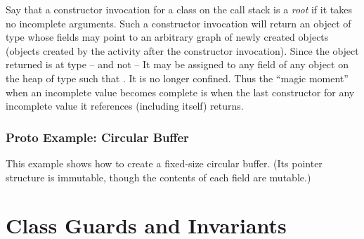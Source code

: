 Say that a constructor invocation for a class  on the call
stack is a {\em root} if it takes no incomplete arguments. Such a
constructor invocation will return an object of type  whose
fields may point to an arbitrary graph of newly created objects
(objects created by the activity after the constructor
invocation). Since the object returned is at type  -- and not
 -- It may be assigned to any field of any object on the
heap of type  such that .  It is no longer
confined. Thus the ``magic moment'' when an incomplete value becomes
complete is when the last constructor for any incomplete value it
references (including itself) returns.

\subsubsection{Proto Example: Circular Buffer}

\begin{example}
This example shows how to create a fixed-size circular buffer.
(Its pointer structure is immutable, though the contents of each
field are mutable.)
\end{example}


\section{Class Guards and Invariants}\label{DepType:ClassGuard}

